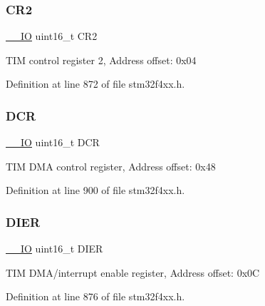 \subsubsection{\texorpdfstring{C\+R2}{CR2}}
{\footnotesize\ttfamily \hyperlink{group___c_m_s_i_s__core__definitions_gaec43007d9998a0a0e01faede4133d6be}{\+\_\+\+\_\+\+IO} uint16\+\_\+t C\+R2}

T\+IM control register 2, Address offset\+: 0x04 

Definition at line 872 of file stm32f4xx.\+h.

\mbox{\label{struct_t_i_m___type_def_a0afd527a4ec64faf878f9957096102bf}} 
\subsubsection{\texorpdfstring{D\+CR}{DCR}}
{\footnotesize\ttfamily \hyperlink{group___c_m_s_i_s__core__definitions_gaec43007d9998a0a0e01faede4133d6be}{\+\_\+\+\_\+\+IO} uint16\+\_\+t D\+CR}

T\+IM D\+MA control register, Address offset\+: 0x48 

Definition at line 900 of file stm32f4xx.\+h.

\mbox{\label{struct_t_i_m___type_def_a1481b34cc41018c17e4ab592a1c8cb55}} 
\subsubsection{\texorpdfstring{D\+I\+ER}{DIER}}
{\footnotesize\ttfamily \hyperlink{group___c_m_s_i_s__core__definitions_gaec43007d9998a0a0e01faede4133d6be}{\+\_\+\+\_\+\+IO} uint16\+\_\+t D\+I\+ER}

T\+IM D\+M\+A/interrupt enable register, Address offset\+: 0x0C 

Definition at line 876 of file stm32f4xx.\+h.

\mbox{\label{struct_t_i_m___type_def_a30c2d8aa9c76dfba0b9a378b64700bda}} 
